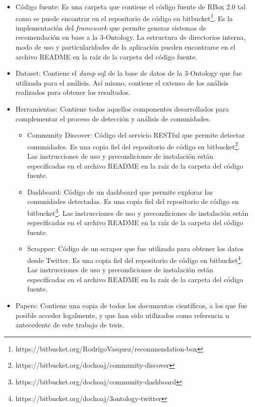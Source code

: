 \begin{itemize}
	\item Código fuente: Es una carpeta que contiene el código fuente de RBox 2.0 tal como se puede encontrar en el repositorio de código en bitbucket\footnote{https://bitbucket.org/RodrigoVasquez/recommendation-box}. Es la implementación del \textit{framework} que permite generar sistemas de recomendación en base a la 3-Ontology. La estructura de directorios interna, modo de uso y particularidades de la aplicación pueden encontrarse en el archivo README en la raíz de la carpeta del código fuente.
	\item Dataset: Contiene el \textit{dump} sql de la base de datos de la 3-Ontology que fue utilizada para el análisis. Así mismo, contiene el extenso de los análisis realizados para obtener los resultados.
	\item Herramientas: Contiene todos aquellos componentes desarrollados para complementar el proceso de detección y análisis de comunidades. \newline
	\begin{itemize}
		\item Community Discover: Código del servicio RESTful que permite detectar comunidades. Es una copia fiel del repositorio de código en bitbucket\footnote{https://bitbucket.org/dochoaj/community-discover}. Las instrucciones de uso y precondiciones de instalación están especificadas en el archivo README en la raíz de la carpeta del código fuente.
		\item Dashboard: Código de un dashboard que permite explorar las comunidades detectadas. Es una copia fiel del repositorio de código en bitbucket\footnote{https://bitbucket.org/dochoaj/community-dashboard}. Las instrucciones de uso y precondiciones de instalación están especificadas en el archivo README en la raíz de la carpeta del código fuente.
		\item Scrapper: Código de un scraper que fue utilizado para obtener los datos desde Twitter. Es una copia fiel del repositorio de código en bitbucket\footnote{https://bitbucket.org/dochoaj/3ontology-twitter}. Las instrucciones de uso y precondiciones de instalación están especificadas en el archivo README en la raíz de la carpeta del código fuente.
	\end{itemize}
	\item Papers: Contiene una copia de todos los documentos científicos, a los que fue posible acceder legalmente, y que han sido utilizados como referencia u antecedente de este trabajo de tesis.
\end{itemize}